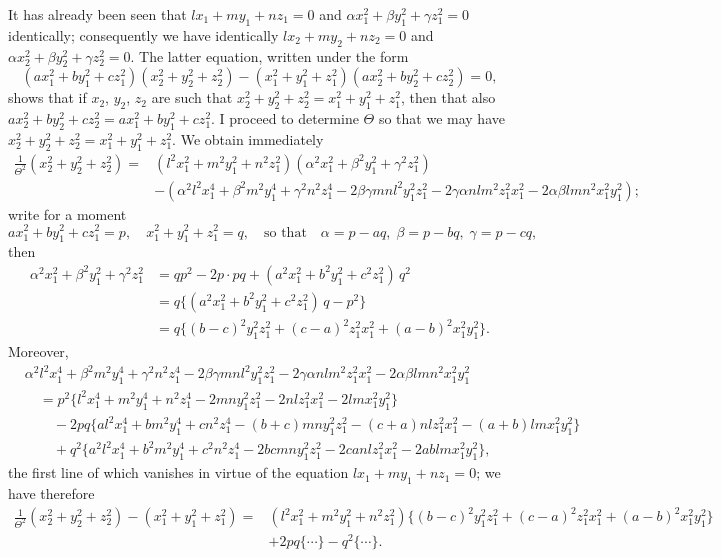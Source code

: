 \documentclass[11pt,a4paper]{article}
\begin{document}
It has already been seen that $l x_1 + m y_1 + n z_1 = 0$ and $\alpha x_1^2 + \beta y_1^2 + \gamma z_1^2 = 0$ identically; consequently we have identically $l x_2 + m y_2 + n z_2 = 0$ and $\alpha x_2^2 + \beta y_2^2 + \gamma z_2^2 = 0$. The latter equation, written under the form
\[
(a x_1^2 + b y_1^2 + c z_1^2)(x_2^2 + y_2^2 + z_2^2) - (x_1^2 + y_1^2 + z_1^2)(a x_2^2 + b y_2^2 + c z_2^2) = 0,
\]
shows that if $x_2$, $y_2$, $z_2$ are such that $x_2^2 + y_2^2 + z_2^2 = x_1^2 + y_1^2 + z_1^2$, then that also $a x_2^2 + b y_2^2 + c z_2^2 = a x_1^2 + b y_1^2 + c z_1^2$. I proceed to determine $\Theta$ so that we may have $x_2^2 + y_2^2 + z_2^2 = x_1^2 + y_1^2 + z_1^2$. We obtain immediately
\begin{align*}
\tfrac{1}{\Theta^2}(x_2^2 + y_2^2 + z_2^2) ={}& (l^2 x_1^2 + m^2 y_1^2 + n^2 z_1^2)(\alpha^2 x_1^2 + \beta^2 y_1^2 + \gamma^2 z_1^2)\\
& - (\alpha^2 l^2 x_1^4 + \beta^2 m^2 y_1^4 + \gamma^2 n^2 z_1^4 - 2\beta\gamma m n l^2 y_1^2 z_1^2 - 2\gamma\alpha n l m^2 z_1^2 x_1^2 - 2\alpha\beta l m n^2 x_1^2 y_1^2);
\end{align*}
write for a moment
\[
ax_1^2 + by_1^2 + cz_1^2 = p,\quad x_1^2 + y_1^2 + z_1^2 = q,\quad\text{so that}\quad \alpha = p - aq,\;\beta = p - bq,\;\gamma = p - cq,
\]
then
\begin{align*}
\alpha^2 x_1^2 + \beta^2 y_1^2 + \gamma^2 z_1^2 &= q p^2 - 2 p\cdot pq + (a^2 x_1^2 + b^2 y_1^2 + c^2 z_1^2)\,q^2\\
&= q\bigl\{(a^2 x_1^2 + b^2 y_1^2 + c^2 z_1^2)\,q - p^2\bigr\}\\
&= q\bigl\{(b - c)^2 y_1^2 z_1^2 + (c - a)^2 z_1^2 x_1^2 + (a - b)^2 x_1^2 y_1^2\bigr\}.
\end{align*}
Moreover,
\begin{align*}
&\alpha^2 l^2 x_1^4 + \beta^2 m^2 y_1^4 + \gamma^2 n^2 z_1^4 - 2\beta\gamma m n l^2 y_1^2 z_1^2 - 2\gamma\alpha n l m^2 z_1^2 x_1^2 - 2\alpha\beta l m n^2 x_1^2 y_1^2\\
&\quad = p^2 \bigl\{ l^2 x_1^4 + m^2 y_1^4 + n^2 z_1^4 - 2 m n y_1^2 z_1^2 - 2 n l z_1^2 x_1^2 - 2 l m x_1^2 y_1^2\bigr\}\\
&\qquad - 2 pq \bigl\{a l^2 x_1^4 + b m^2 y_1^4 + c n^2 z_1^4 - (b + c) m n y_1^2 z_1^2 - (c + a) n l z_1^2 x_1^2 - (a + b) l m x_1^2 y_1^2\bigr\}\\
&\qquad + q^2 \bigl\{ a^2 l^2 x_1^4 + b^2 m^2 y_1^4 + c^2 n^2 z_1^4 - 2 b c m n y_1^2 z_1^2 - 2 c a n l z_1^2 x_1^2 - 2 a b l m x_1^2 y_1^2\bigr\},
\end{align*}
the first line of which vanishes in virtue of the equation $l x_1 + m y_1 + n z_1 = 0$; we have therefore
\begin{align*}
\tfrac{1}{\Theta^2}(x_2^2 + y_2^2 + z_2^2) - (x_1^2 + y_1^2 + z_1^2) ={}& (l^2 x_1^2 + m^2 y_1^2 + n^2 z_1^2)\bigl\{(b-c)^2 y_1^2 z_1^2 + (c-a)^2 z_1^2 x_1^2 + (a-b)^2 x_1^2 y_1^2\bigr\}\\
&+ 2 p q \{\cdots\} - q^2 \{\cdots\}.
\end{align*}
\end{document}

